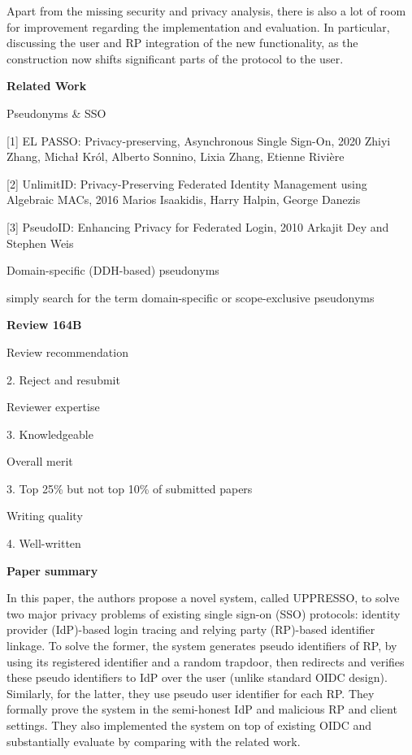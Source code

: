 \documentclass[letterpaper,onecolumn,10pt]{article}
\begin{document}
Apart from the missing security and privacy analysis, there is also a lot of room for improvement regarding the implementation and evaluation. In particular, discussing the user and RP integration of the new functionality, as the construction now shifts significant parts of the protocol to the user.


\vspace{1mm}\noindent\textbf{Related Work}


Pseudonyms \& SSO


[1] EL PASSO: Privacy-preserving, Asynchronous Single Sign-On, 2020
Zhiyi Zhang, Michał Król, Alberto Sonnino, Lixia Zhang, Etienne Rivière

[2] UnlimitID: Privacy-Preserving Federated Identity Management using Algebraic MACs, 2016
Marios Isaakidis, Harry Halpin, George Danezis

[3] PseudoID: Enhancing Privacy for Federated Login, 2010
Arkajit Dey and Stephen Weis

Domain-specific (DDH-based) pseudonyms


simply search for the term domain-specific or scope-exclusive pseudonyms




\vspace{1mm}\noindent\textbf{Review 164B}


Review recommendation


2. Reject and resubmit

Reviewer expertise


3. Knowledgeable

Overall merit


3. Top 25\% but not top 10\% of submitted papers

Writing quality


4. Well-written

\vspace{1mm}\noindent\textbf{Paper summary}


In this paper, the authors propose a novel system, called UPPRESSO, to solve two major privacy problems of existing single sign-on (SSO) protocols: identity provider (IdP)-based login tracing and relying party (RP)-based identifier linkage. To solve the former, the system generates pseudo identifiers of RP, by using its registered identifier and a random trapdoor, then redirects and verifies these pseudo identifiers to IdP over the user (unlike standard OIDC design). Similarly, for the latter, they use pseudo user identifier for each RP. They formally prove the system in the semi-honest IdP and malicious RP and client settings. They also implemented the system on top of existing OIDC and substantially evaluate by comparing with the related work.
\end{document}
